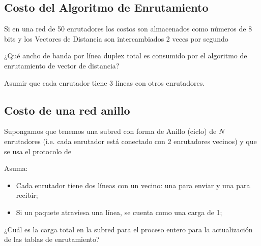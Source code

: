 \documentclass[12pt]{report}
\begin{document}
\begin{exer}
	\subsection{Costo del Algoritmo de Enrutamiento \sthree}
	Si en una red de 50 enrutadores los costos son almacenados como números de 8 bits y los
	Vectores de Distancia son intercambiados 2 veces por segundo

	¿Qué ancho de banda por línea duplex total es consumido por el algoritmo de enrutamiento de vector de distancia?

	Asumir que cada enrutador tiene 3 líneas con otros enrutadores.
\end{exer}

\begin{exer}
	\subsection{Costo de una red anillo \sthree}
	Supongamos que tenemos una subred con forma de Anillo (ciclo) de $N$ enrutadores (i.e.
	cada enrutador está conectado con 2 enrutadores vecinos) y que se usa el protocolo de 

	Asuma:
	\begin{itemize}
		\item Cada enrutador tiene dos líneas con un vecino: una para enviar y una para recibir;
		\item Si un paquete atraviesa una línea, se cuenta como una carga de 1;
	\end{itemize}
	¿Cuál es la carga total en la subred para el proceso entero para la actualización de las tablas
	de enrutamiento?
\end{exer}
\end{document}
